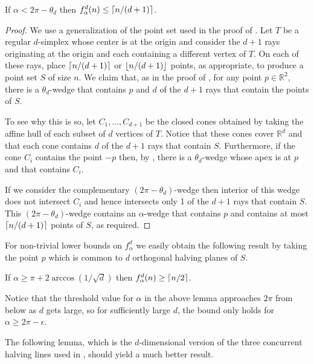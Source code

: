 \documentclass[lotsofwhite]{patmorin}
\begin{document}
\begin{lem}
If $\alpha < 2\pi-\theta_d$ then $f^d_\alpha(n) \le \left\lceil n/(d+1) \right\rceil$.
\end{lem}

\begin{proof} 
We use a generalization of the point set used in the proof of
.  Let $T$ be a regular $d$-simplex whose center is at the
origin and consider the $d+1$ rays originating at the origin and each
containing a different vertex of $T$.  On each of these rays, place
$\left\lceil n/(d+1) \right\rceil$ or $\left\lfloor n/(d+1) \right\rfloor$ points, as appropriate, to
produce a point set $S$ of size $n$.  We claim that, as in the proof
of , for any point $p\in\mathbb{R}^2$, there is a
$\theta_d$-wedge that contains $p$ and $d$ of the $d+1$ rays that
contain the points of $S$. 

To see why this is so, let $C_1,\ldots,C_{d+1}$ be the closed cones
obtained by taking the affine hull of each subset of $d$ vertices of
$T$.  Notice that these cones cover $\mathbb{R}^d$ and that each cone
contains $d$ of the $d+1$ rays that contain $S$.  Furthermore, if the
cone $C_i$ contains the point $-p$ then, by , there
is a $\theta_d$-wedge whose apex is at $p$ and that contains $C_i$.  

If we consider the complementary $(2\pi-\theta_d)$-wedge then interior
of this wedge does not intersect $C_i$ and hence intersects only 1 of
the $d+1$ rays that contain $S$. This $(2\pi-\theta_d)$-wedge contains
an $\alpha$-wedge that contains $p$ and contains at most
$\left\lceil n/(d+1) \right\rceil$ points of $S$, as required.  
\end{proof}


For non-trivial lower bounds on $f^d_\alpha$ we easily obtain the
following result by taking the point $p$ which is common to $d$
orthogonal halving planes of $S$.

\begin{lem}
If $\alpha \ge \pi+2\arccos(1/\sqrt{d})$ then $f_\alpha^d(n)\ge \left\lceil n/2 \right\rceil$.
\end{lem}

Notice that the threshold value for $\alpha$ in the above lemma
approaches $2\pi$ from below as $d$ gets large, so for sufficiently
large $d$, the bound only holds for $\alpha \ge 2\pi -\epsilon$.

The following lemma, which is the $d$-dimensional version of the three
concurrent halving lines used in , should yield a
much better result.
\end{document}
